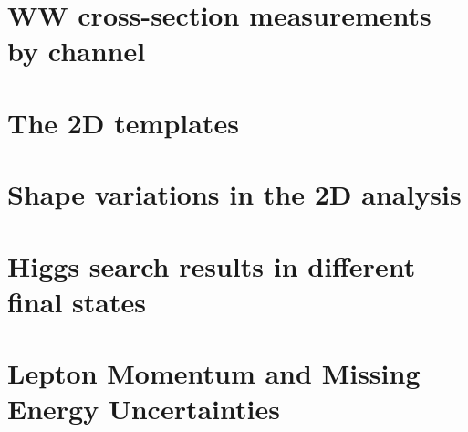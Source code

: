 \documentclass{cmspaper}
\begin{document}

\section{WW cross-section measurements by channel}
     \label{app:appendix_wwxsec}
\clearpage

\section{The 2D templates}
     \label{app:appendix_2dtemplate}
\clearpage

\section{Shape variations in the 2D analysis}
     \label{app:appendix_shapevar_2d}
\clearpage

\section{Higgs search results in different final states}
     \label{app:appendix_limits_bychannel}
\clearpage



\section{Lepton Momentum and Missing Energy Uncertainties}
     \label{app:lep_met_res}
\clearpage
\end{document}

